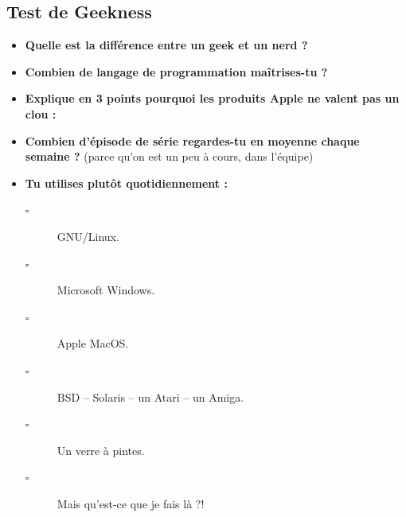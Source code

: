 \subsection*{Test de Geekness}
\begin{itemize}
    \item \textbf{Quelle est la différence entre un geek et un nerd ?}
    \vspace{1cm}
    \item \textbf{Combien de langage de programmation maîtrises-tu ?}
    \vspace{1cm}
    \item \textbf{Explique en 3 points pourquoi les produits Apple ne valent
	pas un clou :}
    \vspace{2cm}
    \item \textbf{Combien d'épisode de série regardes-tu en moyenne chaque
	semaine ?} (parce qu'on est un peu à cours, dans l'équipe)
    \vspace{2cm}
    
    \item \textbf{Tu utilises plutôt quotidiennement :}
    \begin{description}
	\item[$\square$] GNU/Linux.
	\item[$\square$] Microsoft Windows.
	\item[$\square$] Apple MacOS.
	\item[$\square$] BSD -- Solaris -- un Atari -- un Amiga.
	\item[$\square$] Un verre à pintes.
	\item[$\square$] Mais qu'est-ce que je fais là ?!
    \end{description}


\end{itemize}
